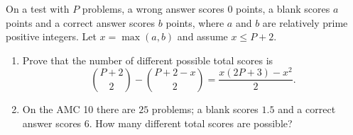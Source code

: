 On a test with $P$ problems, a wrong answer scores $0$ points, a blank scores $a$ points and a correct answer scores $b$ points, where $a$ and $b$ are relatively prime positive integers. Let $x=\max(a,b)$ and assume $x\le P+2$.
\begin{enumerate}
\item[(a)] Prove that the number of different possible total scores is
\[\binom{P+2}{2}-\binom{P+2-x}{2}=\dfrac{x(2P+3)-x^2}{2}.\]
\item[(b)] On the AMC 10 there are $25$ problems; a blank scores $1.5$ and a correct answer scores $6$. How many different total scores are possible?
\end{enumerate}
